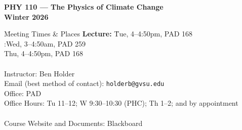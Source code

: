 \documentclass{article}
\begin{document}
\begin{center}
{\bf \Large
PHY 110 --- The Physics of Climate Change\\[6pt]
Winter 2026
}
\end{center}

\vspace{0.5cm}
\begin{center}
\begin{tabbing}
\hspace{2cm} \= Meeting Times \& Places \hspace{2cm} \={\bf Lecture:} \hspace{0.5cm} \=Tue, 4--4:50pm, PAD 168\\
\> :\>Wed, 3--4:50am, PAD 259\\
\>\>Thu, 4--4:50pm, PAD 168\\
\\
\> Instructor: \> Ben Holder\\
\> Email (best method of contact): \> {\tt holderb@gvsu.edu}\\
\> Office:  PAD\\
\> Office Hours: \> Tu 11--12; W 9:30--10:30 (PHC); Th 1--2; and by appointment\\
\\
\> Course Website and Documents: \> Blackboard
\end{tabbing}
\end{center}
\end{document}
